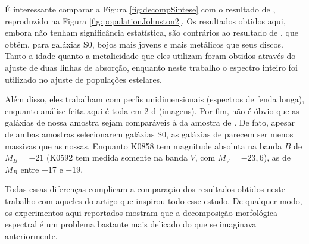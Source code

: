 É interessante comparar a Figura \ref{fig:decompSintese} com o resultado de
\citet{Johnston2012}, reproduzido na Figura \ref{fig:populationJohnston2}.
Os resultados obtidos aqui, embora não tenham significância estatística, são
contrários ao resultado de \citeauthor{Johnston2012}, que obtêm, para galáxias
S0, bojos mais jovens e mais metálicos que seus discos. Tanto a idade quanto a
metalicidade que eles utilizam foram obtidos através do ajuste de duas linhas de
absorção, enquanto neste trabalho o espectro inteiro foi utilizado no ajuste de
populações estelares.

Além disso, eles trabalham com perfis unidimensionais (espectros de fenda
longa), enquanto análise feita aqui é toda em 2-d (imagens). Por fim, não é
óbvio que as galáxias de nossa amostra sejam comparáveis à da amostra de
\citeauthor{Johnston2012}. De fato, apesar de ambas amostras selecionarem
galáxias S0, as galáxias de \citeauthor{Johnston2012} parecem ser menos massivas
que as nossas. Enquanto K0858 tem magnitude absoluta na banda $B$ de $M_B = -21$
(K0592 tem medida somente na banda $V$, com $M_V = -23,6$), as de
\citeauthor{Johnston2012} $M_B$ entre $-17$ e $-19$.

Todas essas diferenças complicam a comparação dos resultados obtidos neste
trabalho com aqueles do artigo que inspirou todo esse estudo. De qualquer modo,
os experimentos aqui reportados mostram que a decomposição morfológica espectral
é um problema bastante mais delicado do que se imaginava anteriormente.


